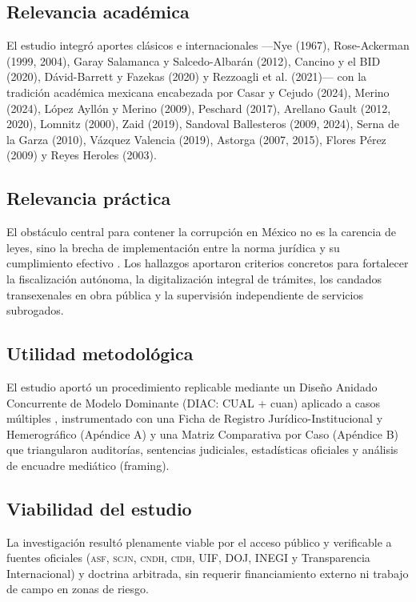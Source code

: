 \documentclass[12pt,letterpaper,oneside]{article}
\newcommand{\siglas}[1]{\textsc{#1}}
\begin{document}
\subsection{Relevancia académica}

El estudio integró aportes clásicos e internacionales ---Nye (1967), Rose-Ackerman (1999, 2004), Garay Salamanca y Salcedo-Albarán (2012), Cancino y el BID (2020), Dávid-Barrett y Fazekas (2020) y Rezzoagli et al. (2021)--- con la tradición académica mexicana encabezada por Casar y Cejudo (2024), Merino (2024), López Ayllón y Merino (2009), Peschard (2017), Arellano Gault (2012, 2020), Lomnitz (2000), Zaid (2019), Sandoval Ballesteros (2009, 2024), Serna de la Garza (2010), Vázquez Valencia (2019), Astorga (2007, 2015), Flores Pérez (2009) y Reyes Heroles (2003).

\subsection{Relevancia práctica}

El obstáculo central para contener la corrupción en México no es la carencia de leyes, sino la brecha de implementación entre la norma jurídica y su cumplimiento efectivo \citep{casar2024,lopezayllon2009,peschard2017}. Los hallazgos aportaron criterios concretos para fortalecer la fiscalización autónoma, la digitalización integral de trámites, los candados transexenales en obra pública y la supervisión independiente de servicios subrogados.

\subsection{Utilidad metodológica}

El estudio aportó un procedimiento replicable mediante un Diseño Anidado Concurrente de Modelo Dominante (DIAC: CUAL + cuan) aplicado a casos múltiples \citep{hernandez2014}, instrumentado con una Ficha de Registro Jurídico-Institucional y Hemerográfico (Apéndice A) y una Matriz Comparativa por Caso (Apéndice B) que triangularon auditorías, sentencias judiciales, estadísticas oficiales y análisis de encuadre mediático (framing).

\subsection{Viabilidad del estudio}

La investigación resultó plenamente viable por el acceso público y verificable a fuentes oficiales (\siglas{asf}, \siglas{scjn}, \siglas{cndh}, \siglas{cidh}, UIF, DOJ, INEGI y Transparencia Internacional) y doctrina arbitrada, sin requerir financiamiento externo ni trabajo de campo en zonas de riesgo.
\end{document}
